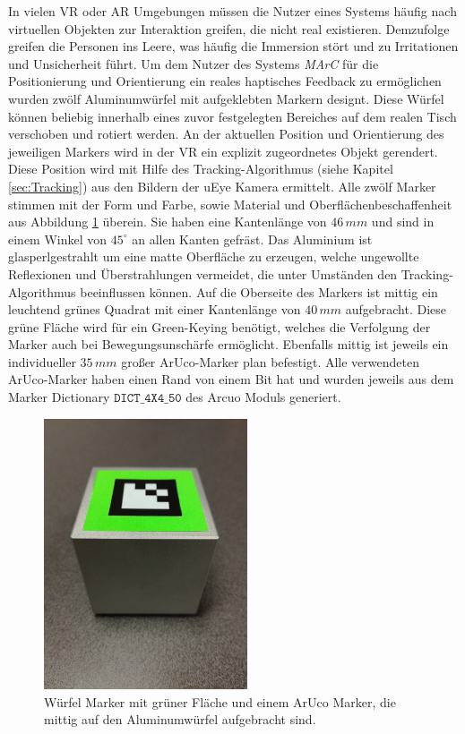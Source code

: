 In vielen VR oder AR Umgebungen müssen die Nutzer eines Systems häufig nach virtuellen Objekten zur Interaktion greifen, die nicht real existieren. Demzufolge greifen die Personen ins Leere, was häufig die Immersion stört und zu Irritationen und Unsicherheit führt.
Um dem Nutzer des Systems \textit{MArC} für die Positionierung und Orientierung ein reales haptisches Feedback zu ermöglichen wurden zwölf Aluminumwürfel mit aufgeklebten Markern designt. Diese Würfel können beliebig innerhalb eines zuvor festgelegten Bereiches auf dem realen Tisch verschoben und rotiert werden. An der aktuellen Position und Orientierung des jeweiligen Markers wird in der VR ein explizit zugeordnetes Objekt gerendert. Diese Position wird mit Hilfe des Tracking-Algorithmus (siehe Kapitel \ref{sec:Tracking}) aus den Bildern der uEye Kamera ermittelt.
Alle zwölf Marker stimmen mit der Form und Farbe, sowie Material und Oberflächenbeschaffenheit aus Abbildung \ref{fig:marker} überein. Sie haben eine Kantenlänge von $46\,mm$ und sind in einem Winkel von $45^\circ$ an allen Kanten gefräst. Das Aluminium ist glasperlgestrahlt um eine matte Oberfläche zu erzeugen, welche ungewollte Reflexionen und Überstrahlungen vermeidet, die unter Umständen den Tracking-Algorithmus beeinflussen können. Auf die Oberseite des Markers ist mittig ein leuchtend grünes Quadrat mit einer Kantenlänge von $40\,mm$ aufgebracht. Diese grüne Fläche wird für ein Green-Keying benötigt, welches die Verfolgung der Marker auch bei Bewegungsunschärfe ermöglicht. Ebenfalls mittig ist jeweils ein individueller $35\,mm$ großer ArUco-Marker plan befestigt. Alle verwendeten ArUco-Marker haben einen Rand von einem Bit hat und wurden jeweils aus dem Marker Dictionary $\texttt{DICT\_4X4\_50}$ des Arcuo Moduls \cite{website:ArucoDoc} generiert.

	\begin{figure}[H] 
	\center 
	\includegraphics[trim = 0mm 280mm 0mm 150mm, clip, width=6cm]{Bilder/tracking-marker.jpg}			
	\caption{Würfel Marker mit grüner Fläche und einem ArUco Marker, die mittig auf den Aluminumwürfel aufgebracht sind.}
	\label{fig:marker}
\end{figure}


